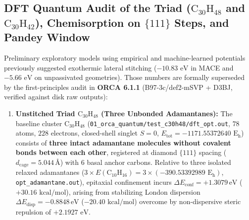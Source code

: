 \documentclass[10pt,twocolumn,a4paper]{article}
\begin{document}
\subsection{DFT Quantum Audit of the Triad ($\text{C}_{30}\text{H}_{48}$ and $\text{C}_{30}\text{H}_{42}$), Chemisorption on $\{111\}$ Steps, and Pandey Window}
Preliminary exploratory models using empirical and machine-learned potentials previously suggested exothermic lateral stitching ($-10.83\text{ eV}$ in MACE and $-5.66\text{ eV}$ on unpassivated geometries). Those numbers are formally superseded by the first-principles audit in \textbf{ORCA 6.1.1} (B97-3c/def2-mSVP + D3BJ, verified against disk raw outputs):
\begin{enumerate}
    \item \textbf{Unstitched Triad $\text{C}_{30}\text{H}_{48}$ (Three Unbonded Adamantanes):} The baseline cluster $\text{C}_{30}\text{H}_{48}$ (\texttt{01\_orca\_quantum/test\_c30h48/dft\_opt.out}, $78$ atoms, $228$ electrons, closed-shell singlet $S=0$, $E_{\text{tot}} = -1171.55372640\text{ E}_\text{h}$) consists of \textbf{three intact adamantane molecules without covalent bonds between each other}, registered at diamond $\{111\}$ spacing ($d_{\text{cage}} = 5.044\,\text{\AA}$) with $6$ basal anchor carbons. Relative to three isolated relaxed adamantanes ($3 \times E(\text{C}_{10}\text{H}_{16}) = 3 \times (-390.53392989\text{ E}_\text{h})$, \texttt{opt\_adamantane.out}), epitaxial confinement incurs $\Delta E_{\text{conf}} = \mathbf{+1.3079}\,\text{eV}$ ($+30.16\text{ kcal/mol}$), arising from stabilizing London dispersion $\Delta E_{\text{disp}} = \mathbf{-0.8848}\,\text{eV}$ ($-20.40\text{ kcal/mol}$) overcome by non-dispersive steric repulsion of $+2.1927\text{ eV}$.

\end{enumerate}
\end{document}
